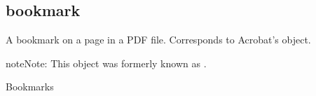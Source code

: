 \documentclass[letterpaper,12pt,english,openany,oneside]{sphinxmanual}
\begin{document}
\subsection{bookmark}
\label{\detokenize{IAC_API_AppleEvtObjects:bookmark}}
A bookmark on a page in a PDF file. Corresponds to Acrobat’s  object.

\begin{sphinxadmonition}{note}{Note:}
This object was formerly known as .
\end{sphinxadmonition}
\label{\detokenize{IAC_API_AppleEvtObjects:plural-form-1}}

Bookmarks

\end{document}
